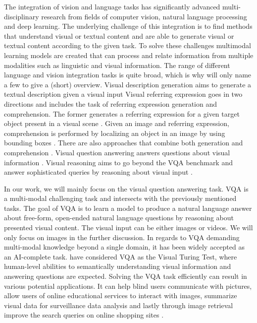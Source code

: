 \documentclass{article}
\begin{document}
The integration of vision and language tasks has significantly advanced multi-disciplinary research from fields of computer vision, natural language processing and deep learning. The underlying challenge of this integration is to find methods that understand visual or textual content and are able to generate visual or textual content according to the given task. To solve these challenges multimodal learning models are created that can process and relate information from multiple modalities such as linguistic and visual information. The range of different language and vision integration tasks is quite broad, which is why will only name a few to give a (short) overview. Visual description generation aims to generate a textual description given a visual input \citep{plummer2015vdg} Visual referring expression goes in two directions and includes the task of referring expression generation and comprehension. The former generates a referring expression for a given target object present in a visual scene \citep{fitzgerald2013learning}. Given an image and referring expression, comprehension is performed by localizing an object in an image by using bounding boxes \citep{nagaraja2016modeling}. There are also approaches that combine both generation and comprehension \citep{yu2016modeling}. Visual question answering answers questions about visual information \citep{antol2015vqa}. Visual reasoning aims to go beyond the VQA benchmark and answer sophisticated queries by reasoning about visual input \citep{johnson2017clevr}.

In our work, we will mainly focus on the visual question answering task. VQA is a  multi-modal challenging task and intersects with the previously mentioned tasks. The goal of VQA is to learn a model to produce a natural language answer about free-form, open-ended natural language questions by reasoning about presented visual content. The visual input can be either images or videos. We will only focus on images in the further discussion. In regards to VQA demanding multi-modal knowledge beyond a single domain, it has been widely accepted as an AI-complete task. \cite{geman2015visual} have considered VQA as the Visual Turing Test, where human-level abilities to semantically understanding visual information and answering questions are expected. Solving the VQA task efficiently can result in various potential applications. It can help blind users communicate with pictures, allow users of online educational services to interact with images, summarize visual data for surveillance data analysis and lastly through image retrieval improve the search queries on online shopping sites \citep{manmadhan2020vqa}.
\end{document}
